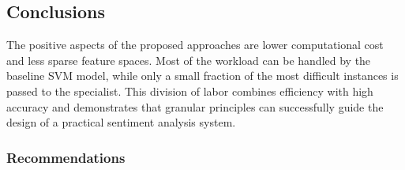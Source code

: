 \documentclass[a4paper,fleqn]{cas-dc}
\begin{document}
\subsection{Conclusions}

The positive aspects of the proposed approaches are lower computational cost and less sparse feature spaces. Most of the workload can be handled by the baseline SVM model, while only a small fraction of the most difficult instances is passed to the specialist. This division of labor combines efficiency with high accuracy and demonstrates that granular principles can successfully guide the design of a practical sentiment analysis system.

\subsubsection{Recommendations}
\end{document}

